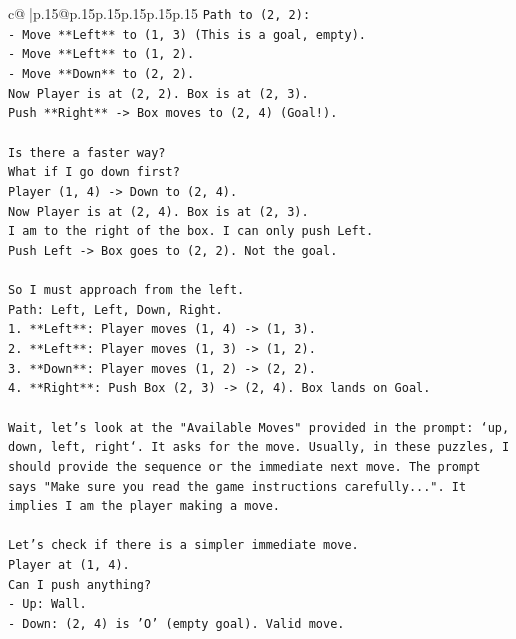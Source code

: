 \documentclass{article}
\begin{document}
{\begin{supertabular}{c@{$\;$}|p{.15\linewidth}@{}p{.15\linewidth}p{.15\linewidth}p{.15\linewidth}p{.15\linewidth}p{.15\linewidth}}
{{{\texttt{Path to (2, 2):} \\
\texttt{{-} Move **Left** to (1, 3) (This is a goal, empty).} \\
\texttt{{-} Move **Left** to (1, 2).} \\
\texttt{{-} Move **Down** to (2, 2).} \\
\texttt{Now Player is at (2, 2). Box is at (2, 3).} \\
\texttt{Push **Right** {-}> Box moves to (2, 4) (Goal!).} \\
\\ 
\texttt{Is there a faster way?} \\
\texttt{What if I go down first?} \\
\texttt{Player (1, 4) {-}> Down to (2, 4).} \\
\texttt{Now Player is at (2, 4). Box is at (2, 3).} \\
\texttt{I am to the right of the box. I can only push Left.} \\
\texttt{Push Left {-}> Box goes to (2, 2). Not the goal.} \\
\\ 
\texttt{So I must approach from the left.} \\
\texttt{Path: Left, Left, Down, Right.} \\
\texttt{1. **Left**: Player moves (1, 4) {-}> (1, 3).} \\
\texttt{2. **Left**: Player moves (1, 3) {-}> (1, 2).} \\
\texttt{3. **Down**: Player moves (1, 2) {-}> (2, 2).} \\
\texttt{4. **Right**: Push Box (2, 3) {-}> (2, 4). Box lands on Goal.} \\
\\ 
\texttt{Wait, let's look at the "Available Moves" provided in the prompt: `up, down, left, right`. It asks for the move. Usually, in these puzzles, I should provide the sequence or the immediate next move. The prompt says "Make sure you read the game instructions carefully...". It implies I am the player making a move.} \\
\\ 
\texttt{Let's check if there is a simpler immediate move.} \\
\texttt{Player at (1, 4).} \\
\texttt{Can I push anything?} \\
\texttt{{-} Up: Wall.} \\
\texttt{{-} Down: (2, 4) is 'O' (empty goal). Valid move.} \\
}}}
\end{supertabular}}
\end{document}
